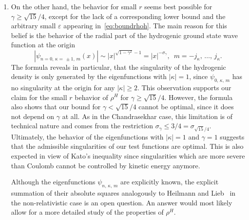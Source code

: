 \documentclass[AHL,Unicode,longabstracts,published]{cedram}
\begin{document}
\begin{enumerate}
\item On the other hand, the behavior for small $r$ seems best possible for $\gamma\geq\sqrt{15}/4$, except for the lack of a corresponding lower bound and the arbitrary small $\varepsilon$ appearing in~\eqref{eq:boundrhoh}. The main reason for this belief is the behavior of the radial part of the hydrogenic ground state wave function at the origin
\[
\left|\psi_{n=0,\,\kappa=\,\pm1,\,m}(x)\right| \sim |x|^{\sqrt{1-\gamma^2}-1} = |x|^{-\sigma_\gamma}, \; \ m=-j_\kappa,\,\dots,\,j_\kappa.
\]
The formula reveals in particular, that the singularity of the hydrogenic density is only generated by the eigenfunctions with $|\kappa|=1$, since $\psi_{0,\,\kappa,\,m}$ has no singularity at the origin for any $|\kappa|\geq2$. This observation supports our claim for the small $r$ behavior of $\rho^H$ for $\gamma\geq\sqrt{15}/4$. However, the formula also shows that our bound for $\gamma<\sqrt{15}/4$ cannot be optimal, since it does not depend on $\gamma$ at all. As in the Chandrasekhar case, this limitation is of technical nature and comes from the restriction $\sigma_\gamma\leq3/4=\sigma_{\sqrt{15}/4}$. Ultimately, the behavior of the eigenfunctions with $|\kappa|=1$ and $\gamma=1$ suggests that the admissible singularities of our test functions are optimal. This is also expected in view of Kato's inequality since singularities which are more severe than Coulomb cannot be controlled by kinetic energy anymore.


Although the eigenfunctions $\psi_{n,\,\kappa,\,m}$ are explicitly known, the explicit summation of their absolute squares analogously to Heilmann and Lieb~\cite{HeilmannLieb1995} in the non-relativistic case is an open question. An answer would most likely allow for a more detailed study of the properties of $\rho^H$.


\end{enumerate}
\end{document}
